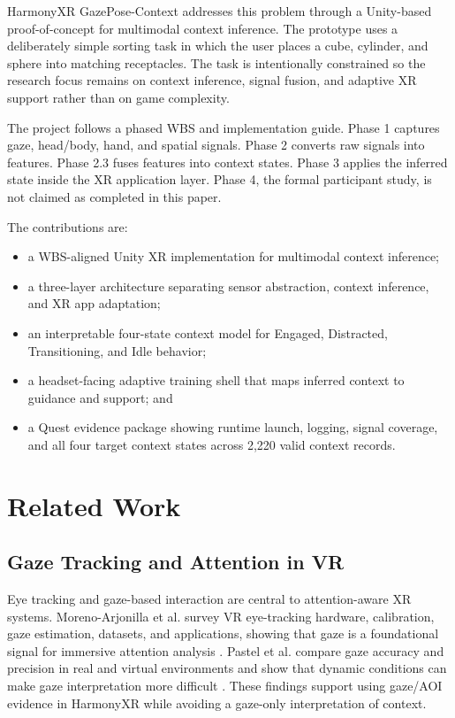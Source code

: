 \documentclass[conference]{IEEEtran}
\begin{document}
HarmonyXR GazePose-Context addresses this problem through a Unity-based proof-of-concept for multimodal context inference. The prototype uses a deliberately simple sorting task in which the user places a cube, cylinder, and sphere into matching receptacles. The task is intentionally constrained so the research focus remains on context inference, signal fusion, and adaptive XR support rather than on game complexity.

The project follows a phased WBS and implementation guide. Phase 1 captures gaze, head/body, hand, and spatial signals. Phase 2 converts raw signals into features. Phase 2.3 fuses features into context states. Phase 3 applies the inferred state inside the XR application layer. Phase 4, the formal participant study, is not claimed as completed in this paper.

The contributions are:
\begin{itemize}
\item a WBS-aligned Unity XR implementation for multimodal context inference;
\item a three-layer architecture separating sensor abstraction, context inference, and XR app adaptation;
\item an interpretable four-state context model for Engaged, Distracted, Transitioning, and Idle behavior;
\item a headset-facing adaptive training shell that maps inferred context to guidance and support; and
\item a Quest evidence package showing runtime launch, logging, signal coverage, and all four target context states across 2,220 valid context records.
\end{itemize}

\section{Related Work}
\subsection{Gaze Tracking and Attention in VR}
Eye tracking and gaze-based interaction are central to attention-aware XR systems. Moreno-Arjonilla et al. survey VR eye-tracking hardware, calibration, gaze estimation, datasets, and applications, showing that gaze is a foundational signal for immersive attention analysis \cite{moreno2024eyetracking}. Pastel et al. compare gaze accuracy and precision in real and virtual environments and show that dynamic conditions can make gaze interpretation more difficult \cite{pastel2021gaze}. These findings support using gaze/AOI evidence in HarmonyXR while avoiding a gaze-only interpretation of context.
\end{document}
